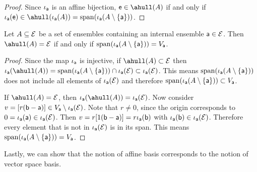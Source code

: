 \begin{mathSection}
\begin{proof}
	Since $\iota_{\ens[a]}$ is an affine bijection, $\ens \in \ahull(A)$ if and only if $\iota_{\ens[a]}(\ens) \in \ahull(\iota_{\ens[a]}(A)) = \vspan(\iota_{\ens[a]}(A \setminus \{\ens[a]\}))$.
\end{proof}

\begin{coro}
	Let $A \subseteq \Ens$ be a set of ensembles containing an internal ensemble $\ens[a] \in \Ens$. Then $\ahull(A) = \Ens$ if and only if $\vspan(\iota_{\ens[a]}(A\setminus\{\ens[a]\})) = V_{\ens[a]}$.
\end{coro}

\begin{proof}
	Since the map $\iota_{\ens[a]}$ is injective, if $\ahull(A) \subset \Ens$ then $\iota_{\ens[a]}(\ahull(A)) = \vspan(\iota_{\ens[a]}(A \setminus \{\ens[a]\})) \cap \iota_{\ens[a]}(\Ens) \subset \iota_{\ens[a]}(\Ens)$. This means $\vspan(\iota_{\ens[a]}(A \setminus \{\ens[a]\}))$ does not include all elements of $\iota_{\ens[a]}(\Ens)$ and therefore $\vspan(\iota_{\ens[a]}(A \setminus \{\ens[a]\})) \subset V_{\ens[a]}$.
	
	If $\ahull(A) = \Ens$, then $\iota_{\ens[a]}(\ahull(A)) = \iota_{\ens[a]}(\Ens)$. Now consider $v = [r(\ens[b] - \ens[a])] \in V_{\ens[a]} \setminus \iota_{\ens[a]}(\Ens)$. Note that $r \neq 0$, since the origin corresponds to $0 = \iota_{\ens[a]}(\ens[a]) \in \iota_{\ens[a]}(\Ens)$. Then $ v = r [1(\ens[b] - \ens[a])] = r \iota_{\ens[a]}(\ens[b])$ with $\iota_{\ens[a]}(\ens[b]) \in \iota_{\ens[a]}(\Ens)$. Therefore every element that is not in $\iota_{\ens[a]}(\Ens)$ is in its span. This means $\vspan(\iota_{\ens[a]}(A\setminus\{\ens[a]\})) = V_{\ens[a]}$.
\end{proof}
\end{mathSection}

Lastly, we can show that the notion of affine basis corresponds to the notion of vector space basis.

